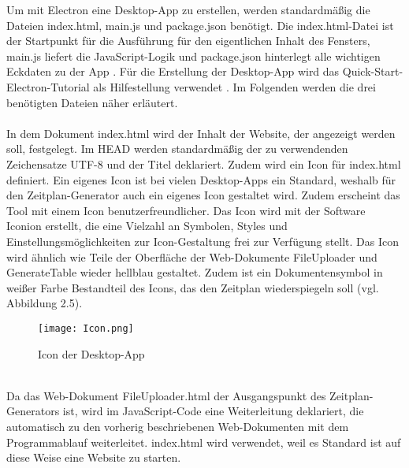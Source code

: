 Um mit Electron eine Desktop-App zu erstellen, werden standardmäßig die Dateien index.html, main.js und package.json benötigt. Die index.html-Datei ist der Startpunkt für die Ausführung für den eigentlichen Inhalt des Fensters, main.js liefert die JavaScript-Logik und package.json hinterlegt alle wichtigen Eckdaten zu der App \cite{electron}. Für die Erstellung der Desktop-App wird das Quick-Start-Electron-Tutorial als Hilfestellung verwendet \cite{electron2}. Im Folgenden werden die drei benötigten Dateien näher erläutert.\\
\\
In dem Dokument index.html wird der Inhalt der Website, der angezeigt werden soll, festgelegt.
Im HEAD werden standardmäßig der zu verwendenden Zeichensatze UTF-8 und der Titel deklariert. Zudem wird ein Icon für index.html definiert. Ein eigenes Icon ist bei vielen Desktop-Apps ein Standard, weshalb für den Zeitplan-Generator auch ein eigenes Icon gestaltet wird. Zudem erscheint das Tool mit einem Icon benutzerfreundlicher. Das Icon wird mit der Software Iconion erstellt, die eine Vielzahl an Symbolen, Styles und Einstellungsmöglichkeiten zur Icon-Gestaltung frei zur Verfügung stellt.  Das Icon wird ähnlich wie Teile der Oberfläche der Web-Dokumente FileUploader und GenerateTable wieder hellblau gestaltet. Zudem ist ein Dokumentensymbol in weißer Farbe Bestandteil des Icons, das den Zeitplan wiederspiegeln soll (vgl. Abbildung 2.5).
\begin{figure}[htbp]
  \centering
  \texttt{[image: Icon.png]}
  \caption{Icon der Desktop-App}
  \label{fig:Fig1}
\end{figure}\\
Da das Web-Dokument FileUploader.html der Ausgangspunkt des Zeitplan-Generators ist, wird im JavaScript-Code eine Weiterleitung deklariert, die automatisch zu den vorherig beschriebenen Web-Dokumenten mit dem Programmablauf weiterleitet. index.html wird verwendet, weil es Standard ist auf diese Weise eine Website zu starten. 
